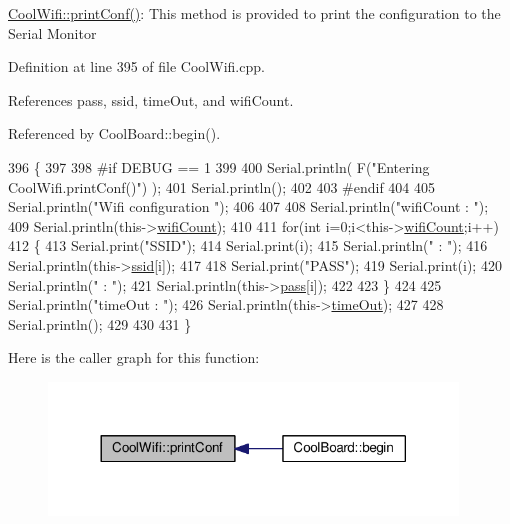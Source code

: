 \hyperlink{classCoolWifi_a9e6105c6d13d35ec510f6633da9e0223}{Cool\+Wifi\+::print\+Conf()}\+: This method is provided to print the configuration to the Serial Monitor 

Definition at line 395 of file Cool\+Wifi.\+cpp.



References pass, ssid, time\+Out, and wifi\+Count.



Referenced by Cool\+Board\+::begin().


\begin{DoxyCode}
396 \{
397 
398 \textcolor{preprocessor}{#if DEBUG == 1 }
399 
400     Serial.println( F(\textcolor{stringliteral}{"Entering CoolWifi.printConf()"}) );
401     Serial.println();   
402 
403 \textcolor{preprocessor}{#endif}
404     
405     Serial.println(\textcolor{stringliteral}{"Wifi configuration "});
406 
407     
408     Serial.println(\textcolor{stringliteral}{"wifiCount : "});
409     Serial.println(this->\hyperlink{classCoolWifi_ab133bd92fcb895b884deecd6678592e4}{wifiCount});
410     
411     \textcolor{keywordflow}{for}(\textcolor{keywordtype}{int} i=0;i<this->\hyperlink{classCoolWifi_ab133bd92fcb895b884deecd6678592e4}{wifiCount};i++)
412     \{   
413         Serial.print(\textcolor{stringliteral}{"SSID"});
414         Serial.print(i);
415         Serial.println(\textcolor{stringliteral}{" : "});
416         Serial.println(this->\hyperlink{classCoolWifi_a893b21d0fed821438733bba2e73fb4c2}{ssid}[i]);
417                 
418         Serial.print(\textcolor{stringliteral}{"PASS"});
419         Serial.print(i);
420         Serial.println(\textcolor{stringliteral}{" : "});
421         Serial.println(this->\hyperlink{classCoolWifi_a0c3332a149245aaad060b32593a54c9b}{pass}[i]);
422         
423     \}
424     
425     Serial.println(\textcolor{stringliteral}{"timeOut : "});
426     Serial.println(this->\hyperlink{classCoolWifi_a952111605f25156588b5632caaba1c6f}{timeOut});
427 
428     Serial.println();
429 
430 
431 \}
\end{DoxyCode}
Here is the caller graph for this function\+:
\nopagebreak
\begin{figure}[H]
\begin{center}
\leavevmode
\includegraphics[width=308pt]{classCoolWifi_a9e6105c6d13d35ec510f6633da9e0223_icgraph}
\end{center}
\end{figure}
\mbox{\label{classCoolWifi_a1c7b4d82a4098d346e7593dce92039fa}} 
